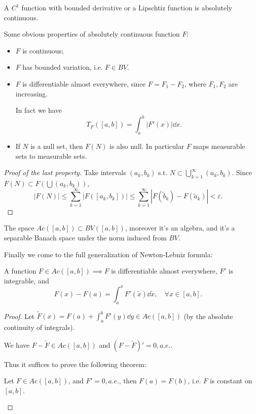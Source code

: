 \begin{example}
    A $C^1$ function with bounded derivative
	or a Lipschtiz function is absolutely continuous.
\end{example}

Some obvious properties of absolutely continuous function $F$:
\begin{itemize}
	\item $F$ is continuous;
	\item $F$ has bounded variation, i.e. $F\in BV$.
	\item $F$ is differentiable almost everywhere, since $F = F_1 - F_2$,
		where $F_1,F_2$ are increasing.

		In fact we have
		\[
			T_F([a,b]) = \int_{a}^{b} |F'(x)|\dd x.
		\]
	\item If $N$ is a null set, then $F(N)$ is also null.
		In particular $F$ maps measurable sets to measurable sets.
\end{itemize}

\begin{proof}[Proof of the last property]
    Take intervals $(a_k,b_k)$ s.t. $N \subset \bigcup_{k=1}^\infty (a_k, b_k)$.
	Since $F(N) \subset F(\bigcup (a_k,b_k))$,
	\[
		|F(N)| \le \sum_{k=1}^{\infty} |F([a_k, b_k])|\le \sum_{k=1}^{\infty}
		|F(\tilde b_k) - F(\tilde a_k)| < \varepsilon.
	\]
\end{proof}

\begin{proposition}
	The space $Ac([a,b]) \subset BV([a,b])$, moreover it's an algebra,
	and it's a separable Banach space under the norm induced from $BV$.
\end{proposition}

Finally we come to the full generalization of Newton-Lebniz formula:
\begin{theorem}
	A function $F\in Ac([a,b]) \implies F$ is differentiable almost everywhere,
	$F'$ is integrable, and
	\[
		F(x) - F(a) = \int_{a}^{x} F'(\tilde x)\dd \tilde x, \quad \forall x\in [a,b].
	\]
\end{theorem}
\begin{proof}[Proof]
	Let $\tilde F(x) = F(a) + \int_{a}^{b} F'(y)\dd y\in Ac([a,b])$
	(by the absolute continuity of integrals).

	We have $F - \tilde F\in Ac([a,b])$ and $(F-\tilde F)' = 0, a.e.$.

	Thus it suffices to prove the following theorem:
	\begin{theorem}
		Let $F\in Ac([a,b])$, and $F'=0,a.e.$, then $F(a)=F(b)$, i.e.
		$F$ is constant on $[a,b]$.
	\end{theorem}
\end{proof}

